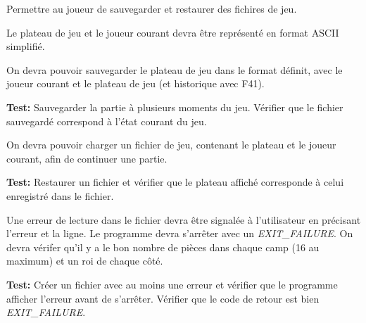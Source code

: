 \documentclass{article}
\begin{document}
\begin{nonfunctionnalneedbox}
    Permettre au joueur de sauvegarder et restaurer des fichires de jeu.
    \begin{subneedbox}
        Le plateau de jeu et le joueur courant devra être représenté en format ASCII simplifié.
    \end{subneedbox}
    \begin{subneedbox}
        On devra pouvoir sauvegarder le plateau de jeu dans le format définit, avec le joueur
         courant et le plateau de jeu (et historique avec F41).

        \textbf{Test:} Sauvegarder la partie à plusieurs moments du jeu. Vérifier que le fichier sauvegardé
        correspond à l'état courant du jeu.
    \end{subneedbox}
    \begin{subneedbox}
        On devra pouvoir charger un fichier de jeu, contenant le plateau et le joueur courant,
        afin de continuer une partie.

        \textbf{Test:} Restaurer un fichier et vérifier que le plateau affiché corresponde à celui
        enregistré dans le fichier.
    \end{subneedbox}
    \begin{subneedbox}
        Une erreur de lecture dans le fichier devra être signalée à l'utilisateur en précisant l'erreur et
        la ligne. Le programme devra s'arrêter avec un \textit{EXIT\_FAILURE}. On devra vérifer qu'il y a
        le bon nombre de pièces dans chaque camp (16 au maximum) et un roi de chaque côté.

        \textbf{Test:} Créer un fichier avec au moins une erreur et vérifier que le programme afficher l'erreur
        avant de s'arrêter. Vérifier que le code de retour est bien \textit{EXIT\_FAILURE}.
    \end{subneedbox}

\end{nonfunctionnalneedbox}
\end{document}
